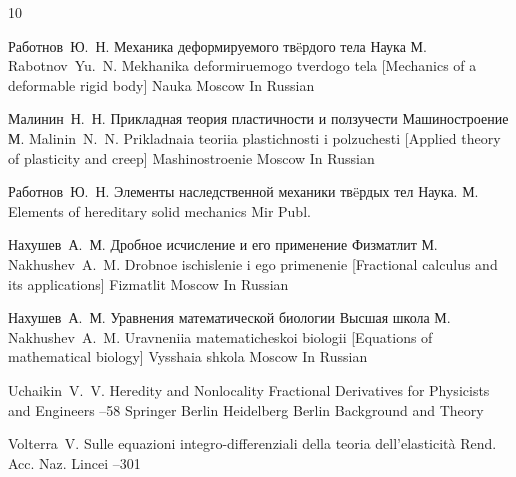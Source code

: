 \begin{thebibliography}{10}

\by Работнов~Ю.~Н.
\book Механика деформируемого тв\"eрдого тела
\publ Наука
\publaddr М.
\misctransl
\by Rabotnov~Yu.~N.
\book Mekhanika deformiruemogo tverdogo tela \rm [Mechanics of a deformable rigid body]
\publ Nauka
\publaddr Moscow
\lang In Russian


\by Малинин~Н.~Н.
\book Прикладная теория пластичности и ползучести
\publ Машиностроение
\publaddr М.
\misctransl
\by Malinin~N.~N.
\book Prikladnaia teoriia plastichnosti i polzuchesti \rm [Applied theory of plasticity and creep]
\publ Mashinostroenie
\publaddr Moscow
\lang In Russian


\by Работнов~Ю.~Н.
\book Элементы наследственной механики тв\"eрдых тел
\publ Наука.
\publaddr М.
\transl
\book Elements of hereditary solid mechanics
\publ Mir Publ.

\by Нахушев~А.~М.
\book Дробное исчисление и его применение
\publ Физматлит
\publaddr М.
\misctransl
\by Nakhushev~A.~M.
\book Drobnoe ischislenie i ego primenenie \rm [Fractional calculus and its applications]
\publ Fizmatlit
\publaddr Moscow
\lang In Russian


\by Нахушев~А.~М.
\book Уравнения математической биологии
\publ Высшая школа
\publaddr М.
\misctransl
\by Nakhushev~A.~M.
\book Uravneniia matematicheskoi biologii \rm [Equations of mathematical biology]
\publ Vysshaia shkola
\publaddr Moscow
\lang In Russian


\by Uchaikin~V.~V.
\paper Heredity and Nonlocality
\inbook Fractional Derivatives for Physicists and Engineers
--58
\publ Springer Berlin Heidelberg
\publaddr Berlin
\volinfo Background and Theory
\moreref
{}

\by Volterra~V.
\paper Sulle equazioni integro-differenziali della teoria dell'elasticit\`a
\jour Rend. Acc. Naz. Lincei
–301



\end{thebibliography}
